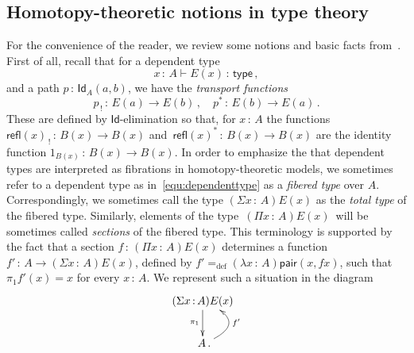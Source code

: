 \documentclass[10pt,a4paper,oneside,reqno]{amsart}
\numberwithin{equation}{section}
\theoremstyle{mythm}
\theoremstyle{mydef}
\theoremstyle{myrmk}
\newcommand{\defeq}{=_{\mathrm{def}}}
\newcommand{\co}{\,{:}\,}
\newcommand{\type}{\mathsf{type}}
\newcommand{\Id}{\mathsf{Id}}
\newcommand{\refl}{\mathsf{refl}}
\newcommand{\pair}{\mathsf{pair}}
\begin{document}
\subsection{Homotopy-theoretic notions in type theory} For the convenience of the reader, 
we review some notions and basic facts from~\cite{HoTT,VoevodskyV:notts}. First of all, recall that for a dependent type
\begin{equation}
\label{equ:dependenttype}
x\co A \vdash E(x) \co \type \, ,
\end{equation} 
and a path $p\co \Id_A(a,b)$, we have the \emph{transport functions} 
\[
p_{\, ! } \co E(a) \rightarrow E(b) \, , \quad p^* \co E(b) \to E(a) \, .
\] 
These are defined by $\Id$-elimination so that, for $x \co A$ the functions $\refl(x)_{\, !} \co B(x) \rightarrow B(x)$ 
and~$\refl(x)^* \co B(x) \to B(x)$ are the identity function $1_{B(x)} \co B(x) \to B(x)$.  In order to emphasize the 
that dependent types are interpreted as fibrations in homotopy-theoretic models, we sometimes refer to a dependent
type as in~\eqref{equ:dependenttype} as a \emph{fibered type} over $A$. Correspondingly, we sometimes call
the type $(\Sigma x \co A)E(x)$ as the \emph{total type} of the fibered type. Similarly, elements of the 
type~$(\Pi x \co A)E(x)$~will be sometimes called \emph{sections} of the fibered type. This terminology is supported by the fact that a section $f \co (\Pi x \co A)E(x)$ determines a function $f' \co A \to (\Sigma x \co A)E(x)$, defined by
$f' \defeq (\lambda x \co A) \pair(x, fx)$, such that $ \pi_1 f'(x) = x$ for every $x \co A$.  We represent such a situation in the diagram
  \[
   \xymatrix{
    (\Sigma x \co A) E(x) \ar[d]_{\pi_1} \\
    \;  A \, . \ar@/_2pc/[u]_{f'} }
     \]
\end{document}
